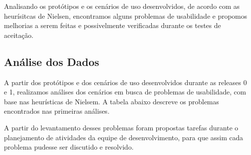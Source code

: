 Analisando os protótipos e os cenários de uso desenvolvidos, de acordo com as heurísitcas de Nielsen, encontramos alguns problemas de usabilidade e propomos melhorias a serem feitas e possivelmente verificadas durante os testes de aceitação.

\subsection{Análise dos Dados}

A partir dos protótipos e dos cenários de uso desenvolvidos durante as releases 0 e 1, realizamos análises dos cenários em busca de problemas de usabilidade, com base nas heurísticas de Nielsem. A tabela abaixo descreve os problemas encontrados nas primeiras análises.

A partir do levantamento desses problemas foram propostas tarefas durante o planejamento de atividades da equipe de desenvolvimento, para que assim cada problema pudesse ser discutido e resolvido.



